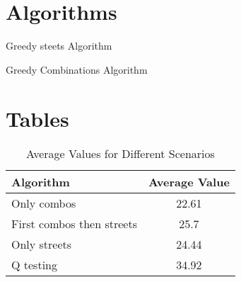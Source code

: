 \appendix
\section*{Algorithms}
 \begin{algorithm}[ht]
\SetAlgoLined
{}
\label{algo:streets}
 \caption{Greedy steets Algorithm}
\end{algorithm}


 \begin{algorithm}[ht]
\SetAlgoLined
{}
\label{algo:combinations}
 \caption{Greedy Combinations Algorithm}
\end{algorithm}

\section*{Tables}
\begin{table}
    \centering
    \begin{tabular}{|l|c|}
        \hline
        \textbf{Algorithm} & \textbf{Average Value} \\
        \hline
        Only combos & 22.61 \\
        First combos then streets & 25.7 \\
        Only streets & 24.44 \\
        Q testing & 34.92 \\
        \hline
    \end{tabular}
    \caption{Average Values for Different Scenarios}
    \label{tab:average_values}
\end{table}
